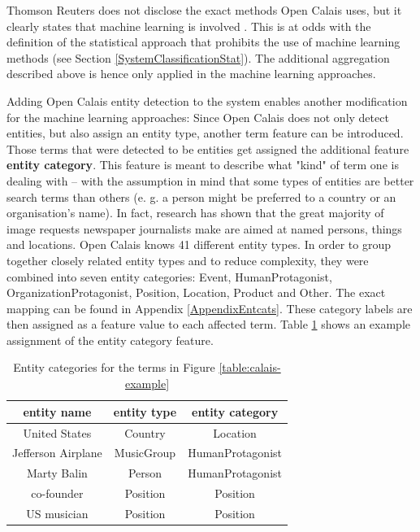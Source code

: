 \documentclass[11pt,a4paper,twoside]{article}
\begin{document}
Thomson Reuters does not disclose the exact methods Open Calais uses, but it clearly states that machine learning is involved \cite{ThomsonReuters2018ThomsonGuide}. This is at odds with the definition of the statistical approach that prohibits the use of machine learning methods (see Section \ref{SystemClassificationStat}). The additional aggregation described above is hence only applied in the machine learning approaches.

\bigskip

Adding Open Calais entity detection to the system enables another modification for the machine learning approaches: Since Open Calais does not only detect entities, but also assign an entity type, another term feature can be introduced. Those terms that were detected to be entities get assigned the additional feature \textbf{entity category}. This feature is meant to describe what "kind" of term one is dealing with -- with the assumption in mind that some types of entities are better search terms than others (e. g. a person might be preferred to a country or an organisation's name). In fact, research has shown that the great majority of image requests newspaper journalists make are aimed at named persons, things and locations. \cite[p. 106]{Westman2006ImageContext} Open Calais knows 41 different entity types. In order to group together closely related entity types and to reduce complexity, they were combined into seven entity categories: Event, HumanProtagonist, OrganizationProtagonist, Position, Location, Product and Other. The exact mapping can be found in Appendix \ref{AppendixEntcats}. These category labels are then assigned as a feature value to each affected term. Table \ref{table:entcat-example} shows an example assignment of the entity category feature.

\begin{table}[b]
    \caption{Entity categories for the terms in Figure \ref{table:calais-example}}
    \centering
    \begin{tabular}{|c|c|c|}
        \hline
        \textbf{entity name} & \textbf{entity type} & \textbf{entity category} \\
        \hline
        United States & Country & Location \\
        Jefferson Airplane & MusicGroup & HumanProtagonist \\
        Marty Balin & Person & HumanProtagonist \\
        co-founder & Position & Position \\
        US musician & Position & Position \\
        \hline 
    \end{tabular}
    \label{table:entcat-example}
\end{table}
\end{document}
